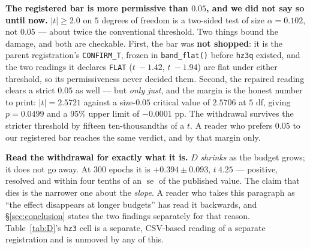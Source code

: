 \documentclass[10pt,letterpaper]{article}
\newcommand{\Dstat}{D}                         %
\newcommand{\arm}[1]{\texttt{#1}}
\DeclareMathOperator{\se}{se}
\begin{document}
\textbf{The registered bar is more permissive than $0.05$, and we did not say so until now.}
$|t| \ge 2.0$ on $5$ degrees of freedom is a two-sided test of size
$\alpha = 0.102$, not $0.05$ --- about twice the conventional threshold. Two things bound the
damage, and both are checkable. First, the bar was \textbf{not shopped}: it is the parent
registration's \texttt{CONFIRM\_T}, frozen in \texttt{band\_flat()} before \arm{hz3q} existed,
and the two readings it declares \texttt{FLAT} ($t\ -1.42$, $t\ -1.94$) are flat under either
threshold, so its permissiveness never decided them. Second, the repaired reading clears a strict
$0.05$ as well --- but \emph{only just}, and the margin is the honest number to print:
$|t| = 2.5721$ against a size-$0.05$ critical value of $2.5706$ at $5$ df, giving
$p = 0.0499$ and a $95\%$ upper limit of $-0.0001$ pp. The withdrawal survives the stricter
threshold by fifteen ten-thousandths of a $t$. A reader who prefers $0.05$ to our registered bar
reaches the same verdict, and by that margin only.

\textbf{Read the withdrawal for exactly what it is.} $\Dstat$ \emph{shrinks} as the budget grows;
it does not go away. At 300 epochs it is $+0.394 \pm 0.093$, $t\ 4.25$ --- positive, resolved and
within four tenths of an $\se$ of the published value. The claim that dies is the narrower one
about the \emph{slope}. A reader who takes this paragraph as ``the effect disappears at longer
budgets'' has read it backwards, and \S\ref{sec:conclusion} states the two findings separately for
that reason. Table~\ref{tab:D}'s \arm{hz3} cell is a separate, CSV-based reading of a separate
registration and is unmoved by any of this.
\end{document}
